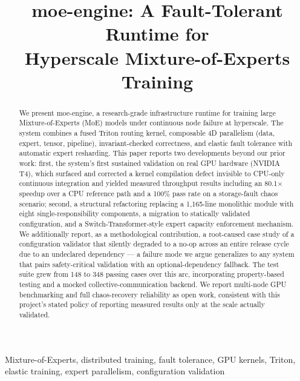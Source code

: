 \documentclass[conference]{IEEEtran}
\begin{document}
\title{moe-engine: A Fault-Tolerant Runtime for\\Hyperscale Mixture-of-Experts Training}

\author{
}

\maketitle

\begin{abstract}
We present moe-engine, a research-grade infrastructure runtime for training
large Mixture-of-Experts (MoE) models under continuous node failure at
hyperscale. The system combines a fused Triton routing kernel, composable
4D parallelism (data, expert, tensor, pipeline), invariant-checked
correctness, and elastic fault tolerance with automatic expert resharding.
This paper reports two developments beyond our prior work: first, the
system's first sustained validation on real GPU hardware (NVIDIA T4),
which surfaced and corrected a kernel compilation defect invisible to
CPU-only continuous integration and yielded measured throughput results
including an 80.1$\times$ speedup over a CPU reference path and a 100\%
pass rate on a storage-fault chaos scenario; second, a structural
refactoring replacing a 1{,}165-line monolithic module with eight
single-responsibility components, a migration to statically validated
configuration, and a Switch-Transformer-style expert capacity enforcement
mechanism. We additionally report, as a methodological contribution, a
root-caused case study of a configuration validator that silently degraded
to a no-op across an entire release cycle due to an undeclared dependency
--- a failure mode we argue generalizes to any system that pairs
safety-critical validation with an optional-dependency fallback. The test
suite grew from 148 to 348 passing cases over this arc, incorporating
property-based testing and a mocked collective-communication backend. We
report multi-node GPU benchmarking and full chaos-recovery reliability as
open work, consistent with this project's stated policy of reporting
measured results only at the scale actually validated.
\end{abstract}

\begin{IEEEkeywords}
Mixture-of-Experts, distributed training, fault tolerance, GPU kernels,
Triton, elastic training, expert parallelism, configuration validation
\end{IEEEkeywords}
\end{document}
